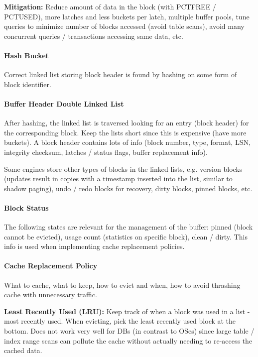 \textbf{Mitigation:} Reduce amount of data in the block (with PCTFREE / PCTUSED), more latches and less buckets per latch, multiple buffer pools, tune queries to minimize number of blocks accessed (avoid table scans), avoid many concurrent queries / transactions accessing same data, etc.

\paragraph{Hash Bucket}
Correct linked list storing block header is found by hashing on some form of block identifier. %

\paragraph{Buffer Header Double Linked List}
After hashing, the linked list is traversed looking for an entry (block header) for the corresponding block. Keep the lists short since this is expensive (have more buckets). A block header contains lots of info (block number, type, format, LSN, integrity checksum, latches / status flags, buffer replacement info).

Some engines store other types of blocks in the linked lists, e.g. version blocks (updates result in copies with a timestamp inserted into the list, similar to shadow paging), undo / redo blocks for recovery, dirty blocks, pinned blocks, etc.

\paragraph{Block Status}
The following states are relevant for the management of the buffer: pinned (block cannot be evicted), usage count (statistics on specific block), clean / dirty. This info is used when implementing cache replacement policies. 

\paragraph{Cache Replacement Policy}
What to cache, what to keep, how to evict and when, how to avoid thrashing cache with unnecessary traffic. %

\textbf{Least Recently Used (LRU):} Keep track of when a block was used in a list - most recently used. When evicting, pick the least recently used block at the bottom. Does not work very well for DBs (in contrast to OSes) since large table / index range scans can pollute the cache without actually needing to re-access the cached data.

